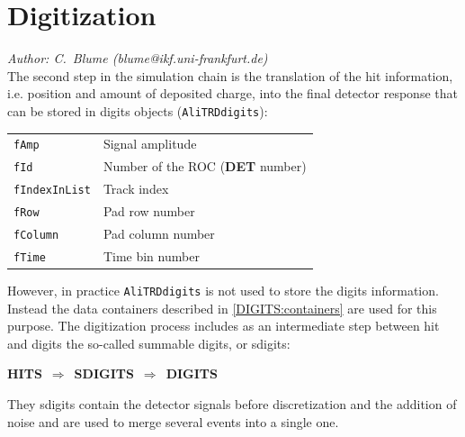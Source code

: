 \documentclass{alicetdr}
\begin{document}
\section{Digitization}
%
{\it Author: C.~Blume (blume@ikf.uni-frankfurt.de)}
\smallskip
\\
%
The second step in the simulation chain is the translation of the hit information,
i.e. position and amount of deposited charge, into the final detector response
that can be stored in digits objects ({\tt AliTRDdigits}):
%
\begin{center}
\begin{tabular}{ll}
{\tt fAmp}         & Signal amplitude                      \\
{\tt fId}          & Number of the ROC ({\bf DET} number)  \\
{\tt fIndexInList} & Track index                           \\
{\tt fRow}         & Pad row number                        \\
{\tt fColumn}      & Pad column number                     \\
{\tt fTime}        & Time bin number                       \\
\end{tabular}
\end{center}
%
However, in practice {\tt AliTRDdigits} is not used to store the digits 
information.  Instead the data containers described in \ref{DIGITS:containers}
are used for this purpose.  The digitization process includes as an 
intermediate step between hit and digits the so-called summable digits, or 
sdigits:
\begin{center}
\mbox{{\bf HITS} $\Longrightarrow$ {\bf SDIGITS} $\Longrightarrow$ {\bf DIGITS}}
\end{center}
They sdigits contain the detector signals before discretization and the addition
of noise and are used to merge several events into a single one.
%
\end{document}
